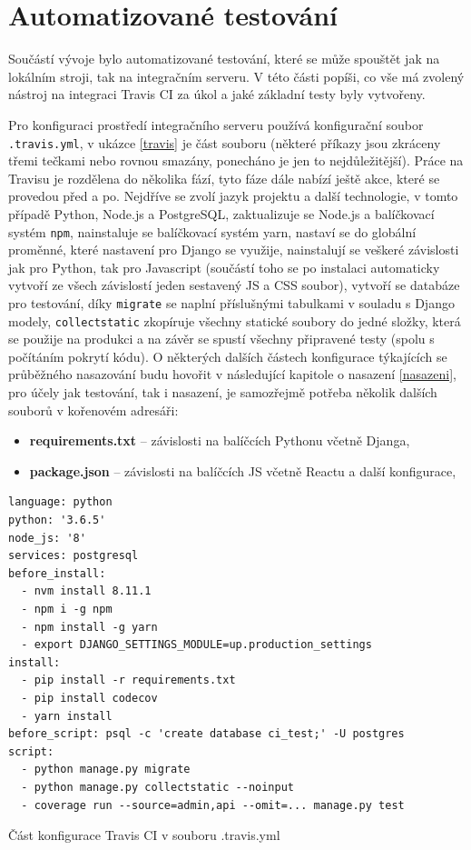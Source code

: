     \section{Automatizované testování}
    Součástí vývoje bylo automatizované testování, které se může spouštět jak na lokálním stroji, tak na integračním serveru. V této části popíši, co vše má zvolený nástroj na integraci Travis CI za úkol a jaké základní testy byly vytvořeny.
    
    Pro konfiguraci prostředí integračního serveru používá konfigurační soubor \verb|.travis.yml|, v ukázce \ref{travis} je část souboru (některé příkazy jsou zkráceny třemi tečkami nebo rovnou smazány, ponecháno je jen to nejdůležitější). Práce na Travisu je rozdělena do několika fází, tyto fáze dále nabízí ještě akce, které se provedou před a po. Nejdříve se zvolí jazyk projektu a další technologie, v tomto případě Python, Node.js a PostgreSQL, zaktualizuje se Node.js a balíčkovací systém \verb|npm|, nainstaluje se balíčkovací systém yarn, nastaví se do globální proměnné, které nastavení pro Django se využije, nainstalují se veškeré závislosti jak pro Python, tak pro Javascript (součástí toho se po instalaci automaticky vytvoří ze všech závislostí jeden sestavený JS a CSS soubor), vytvoří se databáze pro testování, díky \verb|migrate| se naplní příslušnými tabulkami v souladu s Django modely, \verb|collectstatic| zkopíruje všechny statické soubory do jedné složky, která se použije na produkci a na závěr se spustí všechny připravené testy (spolu s počítáním pokrytí kódu). O některých dalších částech konfigurace týkajících se průběžného nasazování budu hovořit v následující kapitole o nasazení \ref{nasazeni}, pro účely jak testování, tak i nasazení, je samozřejmě potřeba několik dalších souborů v kořenovém adresáři:
    \begin{itemize}
        \item \textbf{requirements.txt} -- závislosti na balíčcích Pythonu včetně Djanga,
        \item \textbf{package.json} -- závislosti na balíčcích JS včetně Reactu a další konfigurace,
    \end{itemize}
    
    \begin{listing}[ht]
    	\begin{verbatim}
language: python
python: '3.6.5'
node_js: '8'
services: postgresql
before_install:
  - nvm install 8.11.1
  - npm i -g npm
  - npm install -g yarn
  - export DJANGO_SETTINGS_MODULE=up.production_settings
install:
  - pip install -r requirements.txt
  - pip install codecov
  - yarn install
before_script: psql -c 'create database ci_test;' -U postgres
script:
  - python manage.py migrate
  - python manage.py collectstatic --noinput
  - coverage run --source=admin,api --omit=... manage.py test
    	\end{verbatim}
    	\caption{Část konfigurace Travis CI v souboru .travis.yml}\label{travis}
    \end{listing}
    
